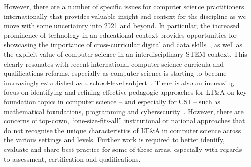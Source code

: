 \documentclass[conference]{IEEEtran}
\begin{document}
However, there are a number of specific issues for computer science
practitioners internationally that provides valuable insight and
context for the discipline as we move with some uncertainty into 2021
and beyond. In particular, the increased prominence of technology in
an educational context provides opportunities for showcasing the
importance of cross-curricular digital and data
skills~\cite{crick:berari2020}, as well as the explicit value of
computer science in an interdisciplinary STEM context. This clearly
resonates with recent international computer science curricula and
qualifications reforms, especially as computer science is starting to
become increasingly established as a school-level
subject~\cite{bell:2014,brown-et-al-toce2014,gal-ezer+stephenson:2014,raman-et-al:2015}.
There is also an increasing focus on identifying and refining
effective pedagogic approaches for LT\&A on key foundation topics in
computer science -- and especially for CS1 -- such as mathematical
foundations, programming and
cybersecurity~\cite{davenport-et-al:latice2016,murphy-et-al:programming2017,simon-et-al:sigcse2018,crick-et-al:fie2019,davenport+crick:fmfun2019,prickett-et-al:iticse2020,crick-et-al:fie2020}. However,
there are concerns of top-down, ``one-size-fits-all'' institutional or
national approaches that do not recognise the unique characteristics
of LT\&A in computer science across the various settings and
levels. Further work is required to better identify, evaluate and
share best practice for some of these areas, especially with regards
to assessment, certification and qualifications.


\end{document}
